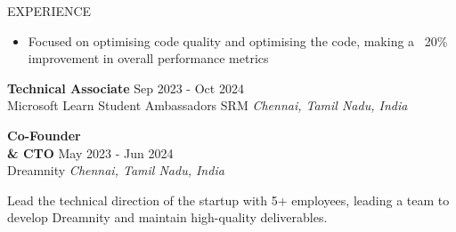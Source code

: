 \documentclass{resume}
\begin{document}
\begin{rSection}{EXPERIENCE}
\begin{itemize}
\item Focused on optimising code quality and optimising the code, making a ~20\% improvement in overall performance metrics
\end{itemize}
\textbf{Technical Associate} \hfill Sep 2023 - Oct 2024\\
Microsoft Learn Student Ambassadors SRM \hfill \textit{Chennai, Tamil Nadu, India}



\textbf{Co-Founder \\& CTO} \hfill May 2023 - Jun 2024\\
Dreamnity \hfill \textit{Chennai, Tamil Nadu, India}

Lead the technical direction of the startup with 5+ employees, leading a team to develop Dreamnity and maintain high-quality deliverables.


\end{rSection}

\vspace{1.5em}

\end{document}

